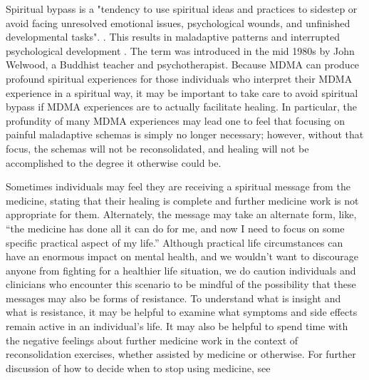 \documentclass[12pt,letterpaper]{article}
\begin{document}
Spiritual bypass is a "tendency to use spiritual ideas and practices to sidestep or avoid facing unresolved emotional issues, psychological wounds, and unfinished developmental tasks". . This results in maladaptive patterns and interrupted psychological development . The term was introduced in the mid 1980s by John Welwood, a Buddhist teacher and psychotherapist. Because MDMA can produce profound spiritual experiences for those individuals who interpret their MDMA experience in a spiritual way, it may be important to take care to avoid spiritual bypass if MDMA experiences are to actually facilitate healing. In particular, the profundity of many MDMA experiences may lead one to feel that focusing on painful maladaptive schemas is simply no longer necessary; however, without that focus, the schemas will not be reconsolidated, and healing will not be accomplished to the degree it otherwise could be.

Sometimes individuals may feel they are receiving a spiritual message from the medicine, stating that their healing is complete and further medicine work is not appropriate for them. Alternately, the message may take an alternate form, like, “the medicine has done all it can do for me, and now I need to focus on some specific practical aspect of my life.”  Although practical life circumstances can have an enormous impact on mental health, and we wouldn't want to discourage anyone from fighting for a healthier life situation, we do caution individuals and clinicians who encounter this scenario to be mindful of the possibility that these messages may also be forms of resistance. To understand what is insight and what is resistance, it may be helpful to examine what symptoms and side effects remain active in an individual's life. It may also be helpful to spend time with the negative feelings about further medicine work in the context of reconsolidation exercises, whether assisted by medicine or otherwise. For further discussion of how to decide when to stop using medicine, see 
\end{document}
